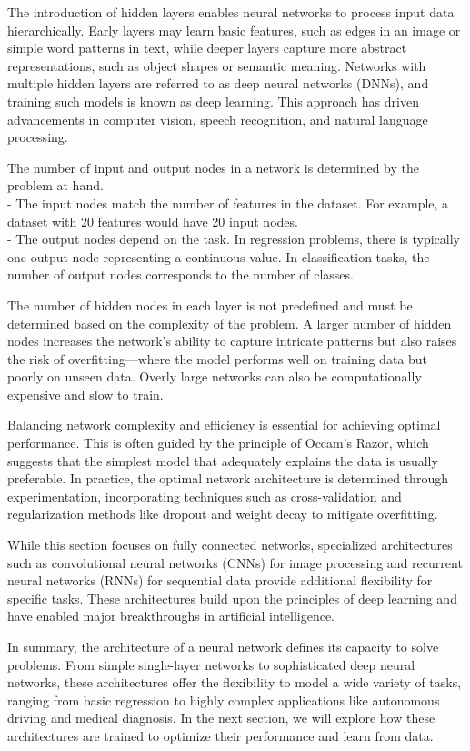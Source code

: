 \documentclass[
  11pt,
]{book}
\theoremstyle{definition}
\theoremstyle{definition}
\theoremstyle{definition}
\theoremstyle{definition}
\theoremstyle{remark}
\begin{document}
The introduction of hidden layers enables neural networks to process input data hierarchically. Early layers may learn basic features, such as edges in an image or simple word patterns in text, while deeper layers capture more abstract representations, such as object shapes or semantic meaning. Networks with multiple hidden layers are referred to as deep neural networks (DNNs), and training such models is known as deep learning. This approach has driven advancements in computer vision, speech recognition, and natural language processing.

The number of input and output nodes in a network is determined by the problem at hand.\\
- The input nodes match the number of features in the dataset. For example, a dataset with 20 features would have 20 input nodes.\\
- The output nodes depend on the task. In regression problems, there is typically one output node representing a continuous value. In classification tasks, the number of output nodes corresponds to the number of classes.

The number of hidden nodes in each layer is not predefined and must be determined based on the complexity of the problem. A larger number of hidden nodes increases the network's ability to capture intricate patterns but also raises the risk of overfitting---where the model performs well on training data but poorly on unseen data. Overly large networks can also be computationally expensive and slow to train.

Balancing network complexity and efficiency is essential for achieving optimal performance. This is often guided by the principle of Occam's Razor, which suggests that the simplest model that adequately explains the data is usually preferable. In practice, the optimal network architecture is determined through experimentation, incorporating techniques such as cross-validation and regularization methods like dropout and weight decay to mitigate overfitting.

While this section focuses on fully connected networks, specialized architectures such as convolutional neural networks (CNNs) for image processing and recurrent neural networks (RNNs) for sequential data provide additional flexibility for specific tasks. These architectures build upon the principles of deep learning and have enabled major breakthroughs in artificial intelligence.

In summary, the architecture of a neural network defines its capacity to solve problems. From simple single-layer networks to sophisticated deep neural networks, these architectures offer the flexibility to model a wide variety of tasks, ranging from basic regression to highly complex applications like autonomous driving and medical diagnosis. In the next section, we will explore how these architectures are trained to optimize their performance and learn from data.
\end{document}
